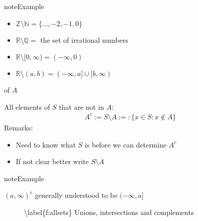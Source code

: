 \documentclass[letterpaper,10pt,english]{jupyterBook}
\begin{document}
\begin{sphinxadmonition}{note}{Example}
\begin{itemize}
\item {} 
\sphinxAtStartPar
\(\mathbb{Z} \setminus \mathbb{N} = \{\ldots, -2, -1, 0\}\)

\item {} 
\sphinxAtStartPar
\(\mathbb{R} \setminus \mathbb{Q} = \) the set of irrational numbers

\item {} 
\sphinxAtStartPar
\(\mathbb{R} \setminus [0, \infty) = (-\infty, 0)\)

\item {} 
\sphinxAtStartPar
\(\mathbb{R} \setminus (a, b) = (-\infty, a] \cup [b, \infty)\)

\end{itemize}
\end{sphinxadmonition}

\sphinxAtStartPar
{} of \(A\)

\sphinxAtStartPar
All elements of \(S\) that are not in \(A\):
\begin{equation*}
\begin{split}
A^c := S \setminus A :=: \{ x \in S : x \notin A \}
\end{split}
\end{equation*}
\sphinxAtStartPar
Remarks:
\begin{itemize}
\item {} 
\sphinxAtStartPar
Need to know what \(S\) is before we can determine \(A^c\)

\item {} 
\sphinxAtStartPar
If not clear better write \(S \setminus A\)

\end{itemize}

\begin{sphinxadmonition}{note}{Example}

\sphinxAtStartPar
\((a,\infty)^c\) generally understood to be \((-\infty, a]\)
\end{sphinxadmonition}

\begin{figure}[htbp]
\centering
\capstart

\noindent{}
\caption{\textbackslash{}label\{f:allsets\} Unions, intersections and complements}\label{\detokenize{03.set_theory:allsets}}\end{figure}
\end{document}
